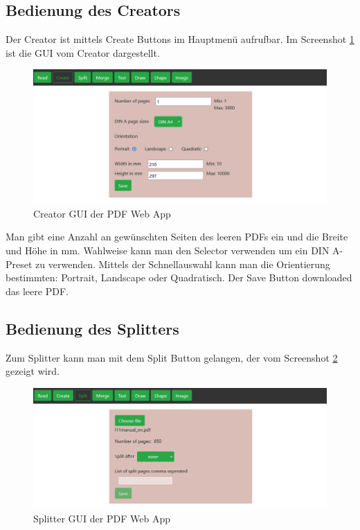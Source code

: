 \subsection{Bedienung des Creators}
Der Creator ist mittels Create Buttons im Hauptmenü aufrufbar. Im Screenshot \ref{fig:creator} ist die GUI vom Creator dargestellt. 

\begin{figure}[!htbp]
	\centering
	\includegraphics[width=1\textwidth]{"images/creator.png"}
	\caption{Creator GUI der PDF Web App}
	\label{fig:creator}
\end{figure}

Man gibt eine Anzahl an gewünschten Seiten des leeren PDFs ein und die Breite und Höhe in mm. Wahlweise kann man den Selector verwenden um ein DIN A-Preset zu verwenden. Mittels der Schnellauswahl kann man die Orientierung bestimmten: Portrait, Landscape oder Quadratisch. Der Save Button downloaded das leere PDF. \\

\subsection{Bedienung des Splitters}
Zum Splitter kann man mit dem Split Button gelangen, der vom Screenshot \ref{fig:splitter} gezeigt wird.

\begin{figure}[!htbp]
	\centering
	\includegraphics[width=1\textwidth]{"images/splitter.png"}
	\caption{Splitter GUI der PDF Web App}
	\label{fig:splitter}
\end{figure}

